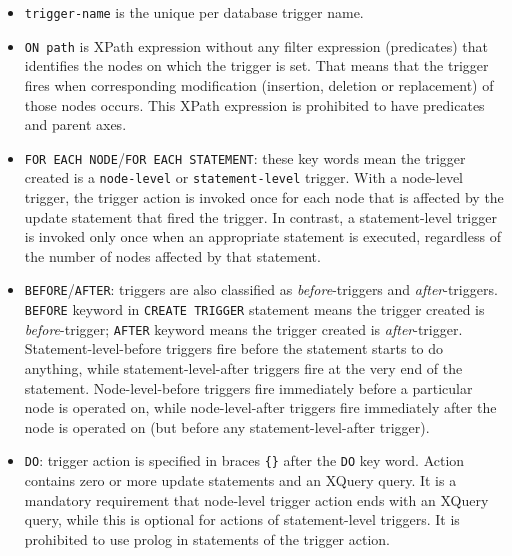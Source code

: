 \documentclass[a4paper,12pt]{article}
\begin{document}
\begin{itemize}
\item\verb!trigger-name! is the unique per database trigger name.

\item\verb!ON path! is XPath expression without any filter expression
(predicates) that identifies the nodes on which the trigger is set. That means
that the trigger fires when corresponding modification (insertion, deletion or
replacement) of those nodes occurs. This XPath expression is prohibited to have
predicates and parent axes.

\item\verb!FOR EACH NODE!/\verb!FOR EACH STATEMENT!: these key words mean the
trigger created is a \verb!node-level! or \verb!statement-level! trigger. With a
node-level trigger, the trigger action is invoked once for each node that is
affected by the update statement that fired the trigger. In contrast, a
statement-level trigger is invoked only once when an appropriate statement is
executed, regardless of the number of nodes affected by that statement.

\item\verb!BEFORE!/\verb!AFTER!: triggers are also classified as
\emph{before}-triggers and \emph{after}-triggers. \verb!BEFORE! keyword in
\verb!CREATE TRIGGER! statement means the trigger created is
\emph{before}-trigger; \verb!AFTER! keyword means the trigger created is
\emph{after}-trigger. Statement-level-before triggers fire before the statement
starts to do anything, while statement-level-after triggers fire at the very end
of the statement. Node-level-before triggers fire immediately before a
particular node is operated on, while node-level-after triggers fire immediately
after the node is operated on (but before any statement-level-after trigger).

\item\verb!DO!: trigger action is specified in braces \verb!{}! after the
\verb!DO! key word. Action contains zero or more update statements and an XQuery
query. It is a mandatory requirement that node-level trigger action ends with an
XQuery query, while this is optional for actions of statement-level triggers. It
is prohibited to use prolog in statements of the trigger action.


\end{itemize}
\end{document}

